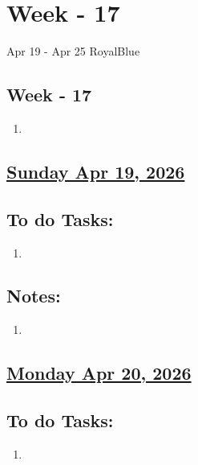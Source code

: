 \section{Week - 17}
\begin{physicsmodule}{Apr 19 - Apr 25 }{RoyalBlue}
  \begin{lawbox}
    \subsection*{ Week - 17}
    \begin{enumerate}
    \item 
\end{enumerate}
  \end{lawbox}
\end{physicsmodule}
\subsection*{\underline{Sunday Apr 19, 2026}}
\subsection*{To do Tasks:}
\begin{enumerate}
    \item 
\end{enumerate}
\subsection*{Notes:}
\begin{enumerate}
    \item 
\end{enumerate}
\subsection*{\underline{Monday Apr 20, 2026}}
\subsection*{To do Tasks:}
\begin{enumerate}
    \item 
\end{enumerate}
